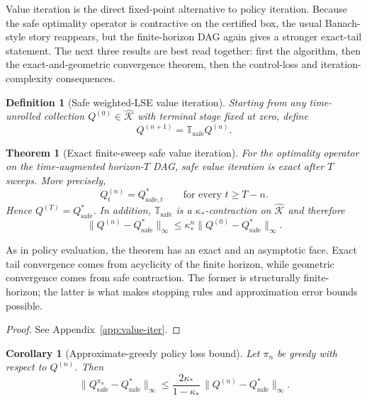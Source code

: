 \documentclass{article}
\newtheorem{theorem}{Theorem}[section]
\newtheorem{corollary}[corollary]{Corollary}
\newtheorem{definition}[definition]{Definition}
\theoremstyle{remark}
\newcommand{\safe}{\mathrm{safe}}
\newcommand{\Ksafe}{\widehat{\mathcal K}}
\begin{document}
Value iteration is the direct fixed-point alternative to policy iteration.
Because the safe optimality operator is contractive on the certified box, the usual Banach-style story reappears, but the finite-horizon DAG again gives a stronger exact-tail statement.
The next three results are best read together: first the algorithm, then the exact-and-geometric convergence theorem, then the control-loss and iteration-complexity consequences.

\begin{definition}[Safe weighted-LSE value iteration]
\label{def:lse-vi}
Starting from any time-unrolled collection $Q^{(0)}\in\Ksafe$ with terminal stage fixed at zero, define
\begin{equation}
Q^{(n+1)} = \mathbb T_\safe Q^{(n)}.
\label{eq:safe-vi}
\end{equation}
\end{definition}

\begin{theorem}[Exact finite-sweep safe value iteration]
\label{thm:vi-convergence}
For the optimality operator on the time-augmented horizon-$T$ DAG, safe value iteration is exact after $T$ sweeps.
More precisely,
\[
Q_t^{(n)} = Q_{\safe,t}^*
\qquad \text{for every } t\ge T-n.
\]
Hence $Q^{(T)}=Q_\safe^*$.
In addition, $\mathbb T_\safe$ is a $\kappa_*$-contraction on $\Ksafe$ and therefore
\begin{equation}
\|Q^{(n)}-Q_\safe^*\|_\infty
\le
\kappa_*^n\|Q^{(0)}-Q_\safe^*\|_\infty.
\label{eq:safe-vi-rate}
\end{equation}
\end{theorem}

As in policy evaluation, the theorem has an exact and an asymptotic face.
Exact tail convergence comes from acyclicity of the finite horizon, while geometric convergence comes from safe contraction.
The former is structurally finite-horizon; the latter is what makes stopping rules and approximation error bounds possible.

\begin{proof}
See Appendix~\ref{app:value-iter}.
\end{proof}

\begin{corollary}[Approximate-greedy policy loss bound]
\label{cor:vi-policy-loss}
Let $\pi_n$ be greedy with respect to $Q^{(n)}$.
Then
\begin{equation}
\|Q_{\safe}^{\pi_n}-Q_\safe^*\|_\infty
\le
\frac{2\kappa_*}{1-\kappa_*}\,\|Q^{(n)}-Q_\safe^*\|_\infty.
\label{eq:safe-vi-policy-bound}
\end{equation}
\end{corollary}
\end{document}
